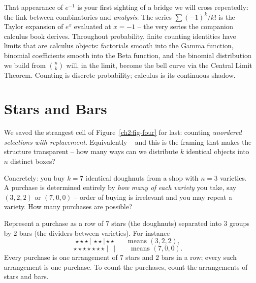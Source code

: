 \begin{connectionbox}
That appearance of $e^{-1}$ is your first sighting of a bridge we will cross repeatedly:
the link between combinatorics and \emph{analysis}. The series $\sum (-1)^k/k!$ is the
Taylor expansion of $e^x$ evaluated at $x=-1$ -- the very series the companion calculus
book derives. Throughout probability, finite counting identities have limits that are
calculus objects: factorials smooth into the Gamma function, binomial coefficients smooth
into the Beta function, and the binomial distribution we build from $\binom{n}{k}$ will, in
the limit, become the bell curve via the Central Limit Theorem. Counting is discrete
probability; calculus is its continuous shadow.
\end{connectionbox}

\section{Stars and Bars}
\label{ch2:starsbars}

We saved the strangest cell of Figure~\ref{ch2:fig-four} for last: counting
\emph{unordered selections with replacement}. Equivalently -- and this is the framing that
makes the structure transparent -- how many ways can we distribute $k$ identical objects into $n$ distinct boxes?

Concretely: you buy $k = 7$ identical doughnuts from a shop with $n = 3$ varieties. A
purchase is determined entirely by \emph{how many of each variety} you take, say $(3,2,2)$
or $(7,0,0)$ -- order of buying is irrelevant and you may repeat a variety. How many
purchases are possible?

\begin{intuitionbox}
Represent a purchase as a row of $7$ stars (the doughnuts) separated into $3$ groups by
$2$ bars (the dividers between varieties). For instance
\[
  \star\star\star \mid \star\star \mid \star\star
  \qquad\text{means } (3,2,2),
\]
\[
  \star\star\star\star\star\star\star \mid\, \mid
  \qquad\text{means } (7,0,0).
\]
Every purchase is one arrangement of $7$ stars and $2$ bars in a row; every such
arrangement is one purchase. To count the purchases, count the arrangements of stars
and bars.
\end{intuitionbox}

